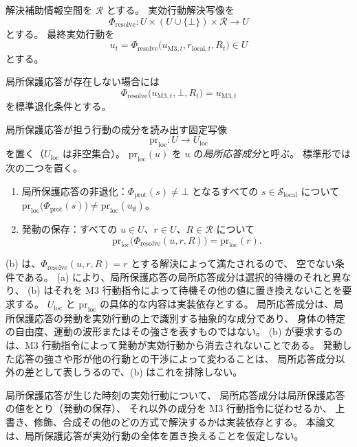 \begin{definition}
\label{def:effective_action_resolve}
解決補助情報空間を $\mathcal R$ とする。
実効行動解決写像を
\[
  \Phi_{\mathrm{resolve}}:
  U\times(U\cup\{\bot\})\times\mathcal R
  \to U
\]
とする。
最終実効行動を
\[
  u_t
  =
  \Phi_{\mathrm{resolve}}
  \bigl(
    u_{\mathrm{M3},t},
    r_{\mathrm{local},t},
    R_t
  \bigr)
  \in U
\]
とする。

局所保護応答が存在しない場合には
\[
  \Phi_{\mathrm{resolve}}
  \bigl(u_{\mathrm{M3},t},\bot,R_t\bigr)
  =u_{\mathrm{M3},t}
\]
を標準退化条件とする。

局所保護応答が担う行動の成分を読み出す固定写像
\[
  \mathrm{pr}_{\mathrm{loc}}:U\to U_{\mathrm{loc}}
\]
を置く（$U_{\mathrm{loc}}$ は非空集合）。
$\mathrm{pr}_{\mathrm{loc}}(u)$ を $u$ の\emph{局所応答成分}と呼ぶ。
標準形では次の二つを置く。
\begin{enumerate}[label=(\alph*)]
  \item 局所保護応答の非退化：$\Phi_{\mathrm{prot}}(s)\neq\bot$ となるすべての $s\in\mathcal S_{\mathrm{local}}$ について
  $\mathrm{pr}_{\mathrm{loc}}\bigl(\Phi_{\mathrm{prot}}(s)\bigr)\neq\mathrm{pr}_{\mathrm{loc}}(u_{\emptyset})$。
  \item 発動の保存：すべての $u\in U$、$r\in U$、$R\in\mathcal R$ について
  \[
    \mathrm{pr}_{\mathrm{loc}}\bigl(\Phi_{\mathrm{resolve}}(u,r,R)\bigr)
    =
    \mathrm{pr}_{\mathrm{loc}}(r).
  \]
\end{enumerate}
(b) は、$\Phi_{\mathrm{resolve}}(u,r,R)=r$ とする解決によって満たされるので、
空でない条件である。
(a) により、局所保護応答の局所応答成分は選択的待機のそれと異なり、
(b) はそれを M3 行動指令によって待機その他の値に置き換えないことを要求する。
$U_{\mathrm{loc}}$ と $\mathrm{pr}_{\mathrm{loc}}$ の具体的な内容は実装依存とする。
局所応答成分は、局所保護応答の発動を実効行動の上で識別する抽象的な成分であり、
身体の特定の自由度、運動の波形またはその強さを表すものではない。
(b) が要求するのは、M3 行動指令によって発動が実効行動から消去されないことである。
発動した応答の強さや形が他の行動との干渉によって変わることは、
局所応答成分以外の差として表しうるので、(b) はこれを排除しない。
\end{definition}

局所保護応答が生じた時刻の実効行動について、
局所応答成分は局所保護応答の値をとり（発動の保存）、
それ以外の成分を M3 行動指令に従わせるか、
上書き、修飾、合成その他のどの方式で解決するかは実装依存とする。
本論文は、局所保護応答が実効行動の全体を置き換えることを仮定しない。

